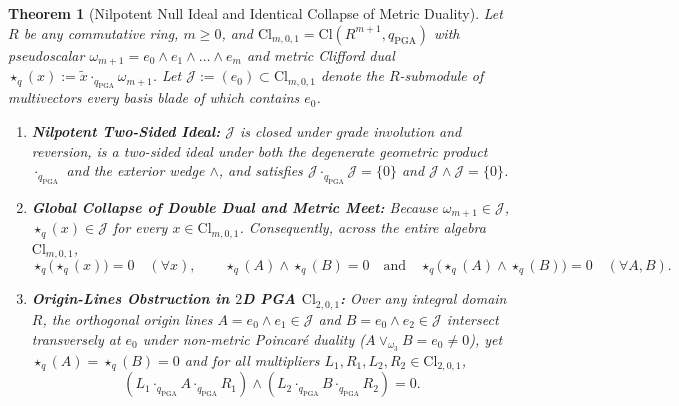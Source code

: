 \documentclass[11pt]{article}
\newtheorem{theorem}{Theorem}[section]
\theoremstyle{definition}
\newcommand{\Cl}{\mathrm{Cl}}
\begin{document}
\begin{theorem}[Nilpotent Null Ideal and Identical Collapse of Metric Duality]\label{thm:r3-pga}
Let $R$ be any commutative ring, $m \ge 0$, and $\Cl_{m,0,1} = \Cl(R^{m+1}, q_{\mathrm{PGA}})$ with pseudoscalar $\omega_{m+1} = e_0 \wedge e_1 \wedge \dots \wedge e_m$ and metric Clifford dual $\star_q(x) := \widetilde{x}\cdot_{q_{\mathrm{PGA}}} \omega_{m+1}$. Let $\mathcal{J} := (e_0) \subset \Cl_{m,0,1}$ denote the $R$-submodule of multivectors every basis blade of which contains $e_0$.
\begin{enumerate}
  \item \textbf{Nilpotent Two-Sided Ideal:} $\mathcal{J}$ is closed under grade involution and reversion, is a two-sided ideal under \emph{both} the degenerate geometric product $\cdot_{q_{\mathrm{PGA}}}$ and the exterior wedge $\wedge$, and satisfies $\mathcal{J}\cdot_{q_{\mathrm{PGA}}} \mathcal{J} = \{0\}$ and $\mathcal{J} \wedge \mathcal{J} = \{0\}$.
  \item \textbf{Global Collapse of Double Dual and Metric Meet:} Because $\omega_{m+1} \in \mathcal{J}$, $\star_q(x) \in \mathcal{J}$ for \emph{every} $x \in \Cl_{m,0,1}$. Consequently, across the \emph{entire} algebra $\Cl_{m,0,1}$,
  \begin{equation}\label{eq:pga-collapse}
    \star_q\bigl(\star_q(x)\bigr) = 0 \quad (\forall x), \qquad
    \star_q(A) \wedge \star_q(B) = 0 \quad\text{and}\quad \star_q\bigl(\star_q(A) \wedge \star_q(B)\bigr) = 0 \quad (\forall A, B).
  \end{equation}
  \item \textbf{Origin-Lines Obstruction in $2$D PGA $\Cl_{2,0,1}$:} Over any integral domain $R$, the orthogonal origin lines $A = e_0 \wedge e_1 \in \mathcal{J}$ and $B = e_0 \wedge e_2 \in \mathcal{J}$ intersect transversely at $e_0$ under non-metric Poincar\'e duality ($A \vee_{\omega_3} B = e_0 \neq 0$), yet $\star_q(A) = \star_q(B) = 0$ and for \emph{all} multipliers $L_1, R_1, L_2, R_2 \in \Cl_{2,0,1}$,
  \[
    (L_1 \cdot_{q_{\mathrm{PGA}}} A \cdot_{q_{\mathrm{PGA}}} R_1) \wedge (L_2 \cdot_{q_{\mathrm{PGA}}} B \cdot_{q_{\mathrm{PGA}}} R_2) = 0.
  \]
\end{enumerate}
\end{theorem}
\end{document}
